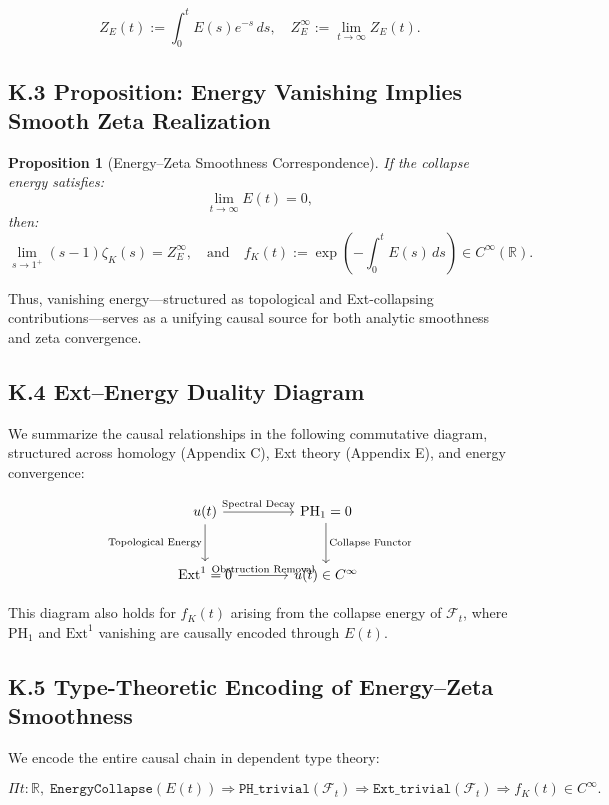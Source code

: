 \documentclass[11pt]{article}
\newtheorem{proposition}[theorem]{Proposition}
\begin{document}
\[
Z_E(t) := \int_0^t E(s) e^{-s} \, ds,
\quad
Z_E^\infty := \lim_{t \to \infty} Z_E(t).
\]

\subsection*{K.3 Proposition: Energy Vanishing Implies Smooth Zeta Realization}

\begin{proposition}[Energy–Zeta Smoothness Correspondence]
\label{prop:energy-zeta}
If the collapse energy satisfies:
\[
\lim_{t \to \infty} E(t) = 0,
\]
then:
\[
\lim_{s \to 1^+} (s-1)\zeta_K(s) = Z_E^\infty,
\quad \text{and} \quad f_K(t) := \exp\left(-\int_0^t E(s) \, ds\right) \in C^\infty(\mathbb{R}).
\]
\end{proposition}

\noindent
Thus, vanishing energy—structured as topological and Ext-collapsing contributions—serves as a unifying causal source for both analytic smoothness and zeta convergence.

\subsection*{K.4 Ext–Energy Duality Diagram}

We summarize the causal relationships in the following commutative diagram, structured across homology (Appendix C), Ext theory (Appendix E), and energy convergence:

\[
\begin{tikzcd}[column sep=large, row sep=large]
u(t) \arrow[r, "\text{Spectral Decay}"] \arrow[d, swap, "\text{Topological Energy}"]
& \mathrm{PH}_1 = 0 \arrow[d, "\text{Collapse Functor}"] \\
\mathrm{Ext}^1 = 0 \arrow[r, "\text{Obstruction Removal}"]
& u(t) \in C^\infty
\end{tikzcd}
\]

\noindent
This diagram also holds for $f_K(t)$ arising from the collapse energy of $\mathcal{F}_t$, where $\mathrm{PH}_1$ and $\mathrm{Ext}^1$ vanishing are causally encoded through $E(t)$.

\subsection*{K.5 Type-Theoretic Encoding of Energy–Zeta Smoothness}

We encode the entire causal chain in dependent type theory:

\[
\Pi t : \mathbb{R},\;
\texttt{EnergyCollapse}(E(t)) \Rightarrow \texttt{PH\_trivial}(\mathcal{F}_t) \Rightarrow \texttt{Ext\_trivial}(\mathcal{F}_t) \Rightarrow f_K(t) \in C^\infty.
\]
\end{document}
